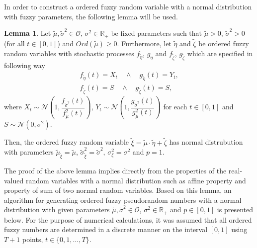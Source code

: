 \documentclass[review]{elsarticle}
\theoremstyle{definition}
\theoremstyle{theorem}
\newtheorem{lemma}{Lemma}
\begin{document}
In order to construct a ordered fuzzy random variable with a normal distribution with fuzzy parameters, the following lemma will be used.

\begin{lemma}
Let $\tilde{\mu}, \tilde{\sigma}^2\in\mathcal{O}$, $\sigma^2\in\mathbb{R_+}$ be fixed parameters such that $\tilde{\mu}> 0$, $\tilde{\sigma}^2>0$ (for all $t\in[0,1]$) and $Ord(\tilde{\mu})\geq 0$. Furthermore, let $\tilde{\eta}$ and $\tilde{\zeta}$ be ordered fuzzy random variables with stochastic processes $f_{\tilde{\eta}}$, $g_{\tilde{\eta}}$ and $f_{\tilde{\zeta}}$, $g_{\tilde{\zeta}}$ which are specified in following way
\begin{align}
f_{\tilde{\eta}}(t) = X_t\quad\wedge\quad g_{\tilde{\eta}}(t) = Y_t,\\
f_{\tilde{\zeta}}(t) = S\quad\wedge\quad g_{\tilde{\zeta}}(t) = S,
\end{align}
where $X_t\sim\mathcal{N}\left(1,\dfrac{f_{\tilde{\sigma}^2}(t)}{f_{\tilde{\mu}}^2(t)}\right)$, $Y_t\sim\mathcal{N}\left(1,\dfrac{g_{\tilde{\sigma}^2}(t)}{g_{\tilde{\mu}}^2(t)}\right)$ for each $t\in[0,1]$ and $S\sim\mathcal{N}\left(0,\sigma^2\right)$. 

Then, the ordered fuzzy random variable $\tilde{\xi}=\tilde{\mu}\cdot\tilde{\eta}+\tilde{\zeta}$ has normal distrubution with parameters $\tilde{\mu}_{\tilde{\xi}}=\tilde{\mu}$, $\tilde{\sigma}_{\tilde{\xi}}^2=\tilde{\sigma}^2$, $\sigma^2_{\xi}=\sigma^2$ and $p=1$.   
\end{lemma}

The proof of the above lemma implies directly from the properties of the real-valued random variables with a normal distribution such as affine property and property of sum of two normal random variables. Based on this lemma, an algorithm for generating ordered fuzzy pseudorandom numbers with a normal distribution with given parameters $\tilde{\mu}, \tilde{\sigma}^2\in\mathcal{O}$, $\sigma^2\in\mathbb{R}_+$ and $p\in[0,1]$ is presented below. For the purpose of numerical calculations, it was assumed that all ordered fuzzy numbers are determined in a discrete manner on the interval $[0, 1]$ using $T + 1$ points, $t \in \{0, 1,\ldots, T\}$.
\end{document}
